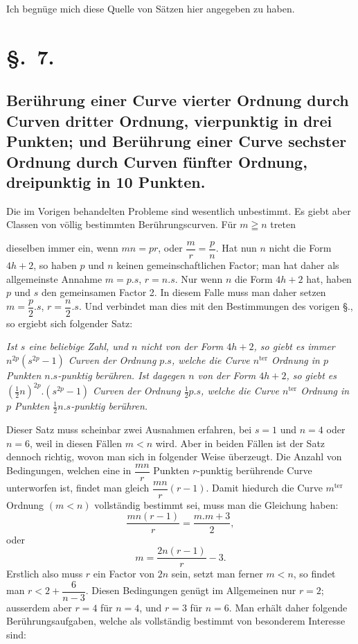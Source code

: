 \documentclass{article}
\begin{document}
Ich begnüge mich diese Quelle von Sätzen hier angegeben zu haben.

\section*{§.~7.}
\subsection*{Berührung einer Curve vierter Ordnung durch Curven dritter Ordnung, vierpunktig in drei Punkten; und Berührung einer Curve sechster Ordnung durch Curven fünfter Ordnung, dreipunktig in 10 Punkten.}

Die im Vorigen behandelten Probleme sind wesentlich unbestimmt. Es giebt aber Classen von völlig bestimmten Berührungscurven. Für $m \geqq n$ treten

dieselben immer ein, wenn $mn = pr$, oder $\dfrac{m}{r} = \dfrac{p}{n}$. Hat nun $n$ nicht die Form $4h+2$, so haben $p$ und $n$ keinen gemeinschaftlichen Factor; man hat daher als allgemeinste Annahme $m = p.s$, $r = n.s$. Nur wenn $n$ die Form $4h+2$ hat, haben $p$ und $s$ den gemeinsamen Factor 2. In diesem Falle muss man daher setzen $m = \dfrac{p}{2}.s$, $r = \dfrac{n}{2}.s$. Und verbindet man dies mit den Bestimmungen des vorigen §., so ergiebt sich folgender Satz:

\emph{Ist $s$ eine beliebige Zahl, und $n$ nicht von der Form $4h+2$, so giebt es immer $n^{2p}(s^{2p}-1)$ Curven der Ordnung $p.s$, welche die Curve $n^{\text{ter}}$ Ordnung in $p$ Punkten $n.s$-punktig berühren. Ist dagegen $n$ von der Form $4h+2$, so giebt es $(\tfrac{1}{2}n)^{2p}.(s^{2p}-1)$ Curven der Ordnung $\tfrac{1}{2}p.s$, welche die Curve $n^{\text{ter}}$ Ordnung in $p$ Punkten $\tfrac{1}{2}n.s$-punktig berühren.}

Dieser Satz muss scheinbar zwei Ausnahmen erfahren, bei $s = 1$ und $n = 4$ oder $n = 6$, weil in diesen Fällen $m < n$ wird. Aber in beiden Fällen ist der Satz dennoch richtig, wovon man sich in folgender Weise überzeugt. Die Anzahl von Bedingungen, welchen eine in $\dfrac{mn}{r}$ Punkten $r$-punktig berührende Curve unterworfen ist, findet man gleich $\dfrac{mn}{r}(r-1)$. Damit hiedurch die Curve $m^{\text{ter}}$ Ordnung $(m < n)$ vollständig bestimmt sei, muss man die Gleichung haben:
\[ \frac{mn(r-1)}{r} = \frac{m.m+3}{2}, \]
oder
\[ m = \frac{2n(r-1)}{r} - 3. \]
Erstlich also muss $r$ ein Factor von $2n$ sein, setzt man ferner $m < n$, so findet man $r < 2 + \dfrac{6}{n-3}$. Diesen Bedingungen genügt im Allgemeinen nur $r = 2$; ausserdem aber $r = 4$ für $n = 4$, und $r = 3$ für $n = 6$. Man erhält daher folgende Berührungsaufgaben, welche als vollständig bestimmt von besonderem Interesse sind:
\end{document}
